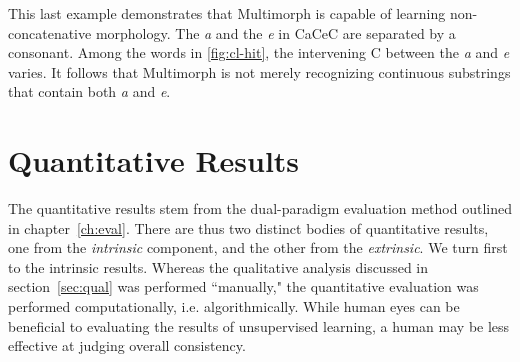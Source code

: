 This last example demonstrates that Multimorph is capable of learning non-concatenative morphology. The \textit{a} and the \textit{e} in CaCeC are separated by a consonant. Among the words in \ref{fig:cl-hit}, the intervening C between the \textit{a} and \textit{e} varies. It follows that Multimorph is not merely recognizing continuous substrings that contain both \textit{a} and \textit{e}.



\section{Quantitative Results}
The quantitative results stem from the dual-paradigm evaluation method outlined in chapter~\ref{ch:eval}. There are thus two distinct bodies of quantitative results, one from the \emph{intrinsic} component, and the other from the \emph{extrinsic}. We turn first to the intrinsic results.
	Whereas the qualitative analysis discussed in section~\ref{sec:qual} was performed ``manually," the quantitative evaluation was performed computationally, i.e. algorithmically. While human eyes can be beneficial to evaluating the results of unsupervised learning, 
	a human may be less effective at judging overall consistency. 
